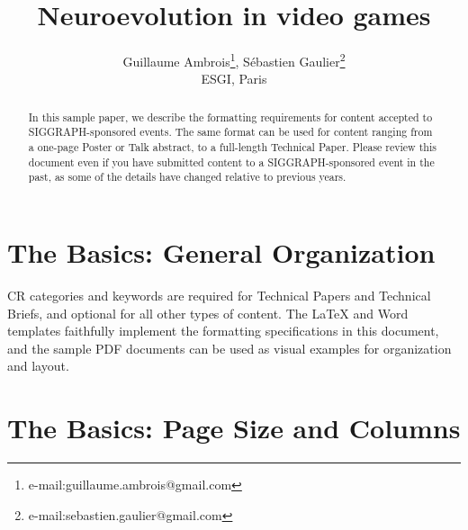 \documentclass[conference]{acmsiggraph}
\title{Neuroevolution in video games}
\author{Guillaume Ambrois\thanks{e-mail:guillaume.ambrois@gmail.com}, Sébastien Gaulier\thanks{e-mail:sebastien.gaulier@gmail.com}\\ESGI, Paris}
\begin{document}


\maketitle

\begin{abstract}

In this sample paper, we describe the formatting requirements for
content accepted to SIGGRAPH-sponsored events. The same format can be
used for content ranging from a one-page Poster or Talk abstract, to a
full-length Technical Paper. Please review this document even if you
have submitted content to a SIGGRAPH-sponsored event in the past, as
some of the details have changed relative to previous years.

\end{abstract}

\keywordlist


\copyrightspace

\section{The Basics: General Organization}

CR categories and keywords are required for Technical Papers and
Technical Briefs, and optional for all other types of content. The
\LaTeX{} and Word templates faithfully implement the formatting
specifications in this document, and the sample PDF documents can be
used as visual examples for organization and layout.

\section{The Basics: Page Size and Columns}
\end{document}
